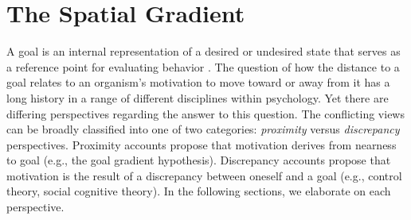 \documentclass[a4paper,doc,natbib,donotrepeattitle]{apa6}
\begin{document}


\section{The Spatial Gradient}

A goal is an internal representation of a desired or undesired state that serves as a reference point for evaluating behavior \citep{Austin1996,Carver1998,Neal}. The question of how the distance to a goal relates to an organism's motivation to move toward or away from it has a long history in a range of different disciplines within psychology. Yet there are differing perspectives regarding the answer to this question. The conflicting views can be broadly classified into one of two categories: \textit{proximity} versus \textit{discrepancy} perspectives. Proximity accounts propose that motivation derives from nearness to goal (e.g., the goal gradient hypothesis). Discrepancy accounts propose that motivation is the result of a discrepancy between oneself and a goal (e.g., control theory, social cognitive theory). In the following sections, we elaborate on each perspective.
\end{document}
